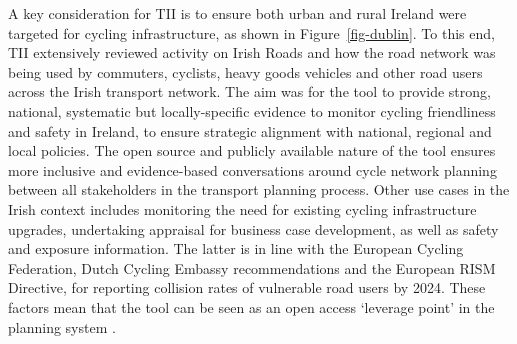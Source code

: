 \documentclass[
  super,
  preprint,
  3p]{elsarticle}
\begin{document}
A key consideration for TII is to ensure both urban and rural Ireland
were targeted for cycling infrastructure, as shown in
Figure~\ref{fig-dublin}. To this end, TII extensively reviewed activity
on Irish Roads and how the road network was being used by commuters,
cyclists, heavy goods vehicles and other road users across the Irish
transport network. The aim was for the tool to provide strong, national,
systematic but locally-specific evidence to monitor cycling friendliness
and safety in Ireland, to ensure strategic alignment with national,
regional and local policies. The open source and publicly available
nature of the tool ensures more inclusive and evidence-based
conversations around cycle network planning between all stakeholders in
the transport planning process. Other use cases in the Irish context
includes monitoring the need for existing cycling infrastructure
upgrades, undertaking appraisal for business case development, as well
as safety and exposure information. The latter is in line with the
European Cycling Federation, Dutch Cycling Embassy recommendations and
the European RISM Directive, for reporting collision rates of vulnerable
road users by 2024. These factors mean that the tool can be seen as an
open access `leverage point' in the planning system
\citep{lovelace2020}.
\end{document}

